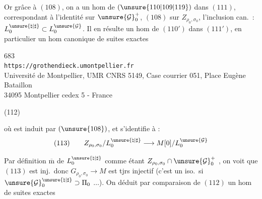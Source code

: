 Or grâce à $(108)$, on a un hom de $(\unsure{110|109|119})$ dans $(111)$,
correspondant à l'identité sur $\unsure{\mathcal G}_0^+$,
$(108)$ sur $Z_{\rho_0,\sigma_0}$, l'inclusion can.\ :
$L_0^{\unsure{\natural|\sharp}}\subset L_0^{\unsure{\mathcal G}}$.
Il en résulte un hom de $(110')$ dans $(111')$, en particulier un hom
canonique de suites exactes


\begin{center}
683\\
\texttt{https://grothendieck.umontpellier.fr}\\
Université de Montpellier, UMR CNRS 5149, Case courrier 051, Place Eugène Bataillon\\
34095 Montpellier cedex 5 - France
\end{center}



(112)\quad
{}

où
est  induit par
$(\unsure{108})$, et s'identifie à :
\[
(113)\qquad Z_{\rho_0,\sigma_0}/L_0^{\unsure{\natural|\sharp}}
\longrightarrow M[0]/L_0^{\unsure{\mathcal G}}
\]

Par définition $\overline{\mathrm m}$ de
$L_0^{\unsure{\natural|\sharp}}$ comme étant
$Z_{\rho_0,\sigma_0}\cap\unsure{\mathcal G}_0^+$
, on voit que $(113)$ est inj.\ donc
$G_{\rho_0,\sigma_0}\longrightarrow M$ est tjrs injectif
(c'est un iso.\ si
$\unsure{\mathcal G}_0^{\unsure{\natural|\sharp}}\supset\Pi_0$
$\ldots$).
On déduit par comparaison de $(112)$ un hom de suites exactes

